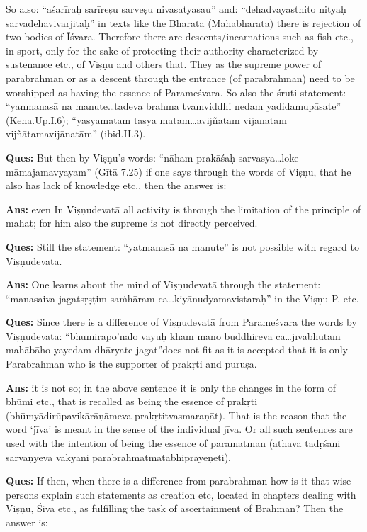 So also: “aśarīraḥ sarīreṣu sarveṣu nivasatyasau” and: “dehadvayasthito nityaḥ sarvadehavivarjitaḥ” in texts like the Bhārata (Mahābhārata) there is rejection of two bodies of Īśvara.  Therefore there are descents/\-incarnations such as fish etc., in sport, only for the sake of protecting their authority characterized by sustenance etc., of Viṣṇu and others that. They as the supreme power of parabrahman or as a descent through the entrance (of parabrahman) need to be worshipped as having the essence of Parameśvara. So also the śruti statement: “yanmanasā na manute…tadeva brahma tvamviddhi nedam yadidamupā\-sate” (Kena.Up.I.6); “yasyāmatam tasya matam…avijñātam vijānatām vijñātamavijānatām” (ibid.II.3).

\textbf{Ques:} But then by Viṣṇu’s words: “nāham prakāśaḥ sarvasya…loke māmajamavyayam” (Gītā 7.25) if one says through the words of Viṣṇu, that he also has lack of knowledge etc., then the answer is: 

\textbf{Ans:} even In Viṣṇudevatā all activity is through the limitation of the principle of mahat; for him also the supreme is not directly perceived.  

\textbf{Ques:} Still the statement: “yatmanasā na manute” is not possible with regard to Viṣṇudevatā. 

\textbf{Ans:} One learns about the mind of Viṣṇudevatā through the statement: “manasaiva jagatsṛṣṭim saṁhāram ca…kiyānudyamavistaraḥ” in the Viṣṇu P. etc. 

\textbf{Ques:} Since there is a difference of Viṣṇudevatā from Parameśvara the words by Viṣṇudevatā: “bhūmirāpo’nalo vāyuḥ kham mano buddhireva ca…jīvabhūtām mahābāho yayedam dhāryate jagat”does not fit as it is accepted that it is only Parabrahman who is the supporter of prakṛti and puruṣa.

\textbf{Ans:} it is not so; in the above sentence it is only the changes in the form of bhūmi etc., that is recalled as being the essence of prakṛti (bhūmyādirūpavikārāṇāmeva prakṛtitvasmaraṇāt). That is the reason that the word ‘jīva’ is meant in the sense of the individual jīva. Or all such sentences are used with the intention of being the essence of paramātman (athavā tādṛśāni sarvāṇyeva vākyāni parabrahmātmatābhiprāyeṇeti).

\textbf{Ques:} If then, when there is a difference from parabrahman how is it that  wise persons explain such statements as creation etc, located in chapters dealing with Viṣṇu, Śiva etc., as fulfilling the task of ascertainment of Brahman? Then the answer is:

